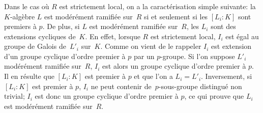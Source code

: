 \subsubsection{}
\label{XIII.2.0.1}
Dans le cas o\`u $R$ est strictement local, on a la
caract\'erisation simple suivante: la $K$-alg\`ebre $L$ est
mod\'er\'ement ramifi\'ee sur~$R$ si et seulement si les
$[L_i:K]$ sont premiers \`a $p$. De plus, si $L$ est
mod\'er\'ement ramifi\'ee sur~$R$, les $L_i$ sont des extensions
cycliques de~$K$. En effet, lorsque $R$ est strictement local, $I_i$
est \'egal au groupe de Galois
de~$L'_i$ sur~$K$. Comme on vient de le rappeler $I_i$ est extension
d'un groupe cyclique d'ordre premier \`a $p$ par un $p$-groupe. Si
l'on suppose $L'_i$ mod\'er\'ement ramifi\'ee sur~$R$, $I_i$ est
alors un groupe cyclique d'ordre premier \`a $p$. Il en r\'esulte
que $[L_i:K]$ est premier \`a $p$ et que l'on a $L_i =
L'_i$. Inversement, si $[L_i:K]$ est premier \`a $p$, $I_i$ ne peut
contenir de~$p$-sous-groupe distingu\'e non trivial; $I_i$ est donc
un groupe cyclique d'ordre premier \`a $p$, ce qui prouve que $L_i$
est mod\'er\'ement ramifi\'ee sur~$R$.

